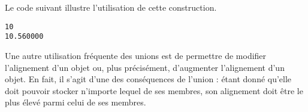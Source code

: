 \documentclass[]{article}
\newenvironment{Shaded}{}{}
\newcommand{\KeywordTok}[1]{\textcolor[rgb]{0.00,0.44,0.13}{\textbf{{#1}}}}
\newcommand{\DataTypeTok}[1]{\textcolor[rgb]{0.56,0.13,0.00}{{#1}}}
\newcommand{\DecValTok}[1]{\textcolor[rgb]{0.25,0.63,0.44}{{#1}}}
\newcommand{\FloatTok}[1]{\textcolor[rgb]{0.25,0.63,0.44}{{#1}}}
\newcommand{\SpecialCharTok}[1]{\textcolor[rgb]{0.25,0.44,0.63}{{#1}}}
\newcommand{\StringTok}[1]{\textcolor[rgb]{0.25,0.44,0.63}{{#1}}}
\newcommand{\ImportTok}[1]{{#1}}
\newcommand{\ControlFlowTok}[1]{\textcolor[rgb]{0.00,0.44,0.13}{\textbf{{#1}}}}
\newcommand{\PreprocessorTok}[1]{\textcolor[rgb]{0.74,0.48,0.00}{{#1}}}
\newcommand{\NormalTok}[1]{{#1}}
\begin{document}
Le code suivant illustre l'utilisation de cette construction.

\begin{Shaded}
\end{Shaded}

\begin{verbatim}
10
10.560000
\end{verbatim}

Une autre utilisation fréquente des unions est de permettre de modifier
l'alignement d'un objet ou, plus précisément, d'augmenter l'alignement
d'un objet. En fait, il s'agit d'une des conséquences de l'union : étant
donné qu'elle doit pouvoir stocker n'importe lequel de ses membres, son
alignement doit être le plus élevé parmi celui de ses membres.
\end{document}
